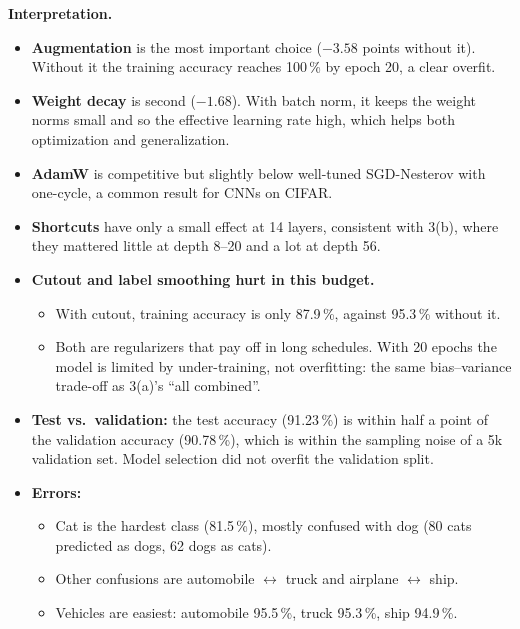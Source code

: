 \documentclass[11pt,a4paper]{article}
\begin{document}
\textbf{Interpretation.}
\begin{itemize}
  \item \textbf{Augmentation} is the most important choice ($-3.58$ points without it). Without it the training accuracy reaches 100\,\% by epoch 20, a clear overfit.
  \item \textbf{Weight decay} is second ($-1.68$). With batch norm, it keeps the weight norms small and so the effective learning rate high, which helps both optimization and generalization.
  \item \textbf{AdamW} is competitive but slightly below well-tuned SGD-Nesterov with one-cycle, a common result for CNNs on CIFAR.
  \item \textbf{Shortcuts} have only a small effect at 14 layers, consistent with 3(b), where they mattered little at depth 8--20 and a lot at depth 56.
  \item \textbf{Cutout and label smoothing hurt in this budget.}
  \begin{itemize}
    \item With cutout, training accuracy is only 87.9\,\%, against 95.3\,\% without it.
    \item Both are regularizers that pay off in long schedules. With 20 epochs the model is limited by under-training, not overfitting: the same bias--variance trade-off as 3(a)'s ``all combined''.
  \end{itemize}
  \item \textbf{Test vs.\ validation:} the test accuracy (91.23\,\%) is within half a point of the validation accuracy (90.78\,\%), which is within the sampling noise of a 5k validation set. Model selection did not overfit the validation split.
  \item \textbf{Errors:}
  \begin{itemize}
    \item Cat is the hardest class (81.5\,\%), mostly confused with dog (80 cats predicted as dogs, 62 dogs as cats).
    \item Other confusions are automobile $\leftrightarrow$ truck and airplane $\leftrightarrow$ ship.
    \item Vehicles are easiest: automobile 95.5\,\%, truck 95.3\,\%, ship 94.9\,\%.
  \end{itemize}
\end{itemize}

\end{document}
